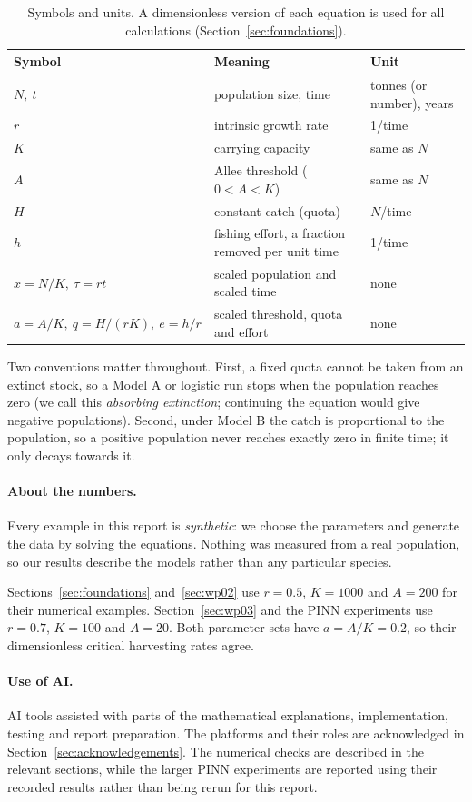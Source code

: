\begin{table}[ht]
\centering
\caption{Symbols and units. A dimensionless version of each equation is used for all calculations (Section~\ref{sec:foundations}).}
\label{tab:notation}
\small
\begin{tabular}{p{}p{}p{}}
\toprule
\textbf{Symbol} & \textbf{Meaning} & \textbf{Unit}\\
\midrule
$N,\ t$ & population size, time & tonnes (or number), years\\
$r$ & intrinsic growth rate & 1/time\\
$K$ & carrying capacity & same as $N$\\
$A$ & Allee threshold ($0<A<K$) & same as $N$\\
$H$ & constant catch (quota) & $N$/time\\
$h$ & fishing effort, a fraction removed per unit time & 1/time\\
$x=N/K,\ \tau=rt$ & scaled population and scaled time & none\\
$a=A/K,\ q=H/(rK),\ e=h/r$ & scaled threshold, quota and effort & none\\
\bottomrule
\end{tabular}
\end{table}

Two conventions matter throughout. First, a fixed quota cannot be taken from an extinct stock, so a Model A or logistic run stops when the population reaches zero (we call this \emph{absorbing extinction}; continuing the equation would give negative populations). Second, under Model B the catch is proportional to the population, so a positive population never reaches exactly zero in finite time; it only decays towards it.


\paragraph{About the numbers.}
Every example in this report is \emph{synthetic}: we choose the
parameters and generate the data by solving the equations.
Nothing was measured from a real population, so our results
describe the models rather than any particular species.

Sections~\ref{sec:foundations} and~\ref{sec:wp02}
use $r=0.5$, $K=1000$ and $A=200$ for their numerical
examples. Section~\ref{sec:wp03} and the PINN experiments
use $r=0.7$, $K=100$ and $A=20$.
Both parameter sets have $a=A/K=0.2$, so their
dimensionless critical harvesting rates agree.


\paragraph{Use of AI.}
AI tools assisted with parts of the mathematical explanations,
implementation, testing and report preparation. The platforms
and their roles are acknowledged in
Section~\ref{sec:acknowledgements}.
The numerical checks are described in the relevant sections,
while the larger PINN experiments are reported using their
recorded results rather than being rerun for this report.
